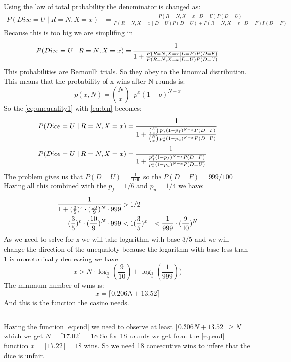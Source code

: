 Using the law of total probability the denominator is changed as:
\begin{align*}
P(Dice=U\mid R=N,X=x) &= \frac{P(R=N,X=x\mid D=U)P(D=U)}{P(R=N,X=x\mid D=U)P(D=U)+P(R=N,X=x\mid D=F)P(D=F)}
\end{align*}
Because this is too big we are simplifing in
\begin{equation} \label{eq:unequality1}
P(Dice=U\mid R=N,X=x) =\cfrac{1}{1+ \frac{P(R=N,X=x\mid D=F)P(D=F)}{P(R=N,X=x\mid D=U)P(D=U)}}
\end{equation}
This probabilities are Bernoulli trials. So they obey to the binomial distribution.
This means that the probability of x wins after N rounds is:
\begin{equation} \label{eq:bin}
p(x,N) = \binom{N}{x} \cdot p^x(1-p)^{N-x}
\end{equation}
So the \ref{eq:unequality1} with \ref{eq:bin} becomes:
\begin{align*}
P(Dice=U\mid R=N,X=x) &=\cfrac{1}{1+ \frac{\binom{N}{x} \cdot p_f^x(1-p_f)^{N-x}P(D=F)}{\binom{N}{x} \cdot p_u^x(1-p_u)^{N-x}P(D=U)}} \\
P(Dice=U\mid R=N,X=x) &=\cfrac{1}{1+\frac{p_f^x(1-p_f)^{N-x}P(D=F)}{p_u^x(1-p_u)^{N-x}P(D=U)}}
\end{align*}
The problem gives us that $P(D=U) = \frac{1}{1000}$ so the $P(D=F) =999/100$
Having all this combined with the $p_f=1/6$ and $p_u=1/4$ we have:
\begin{align*}
\cfrac{1}{1 + (\frac{3}{5})^x\cdot(\frac{10}{9})^N\cdot999 } &> 1/2 \\
(\frac{3}{5})^x\cdot(\frac{10}{9})^N\cdot999 &<1
(\frac{3}{5})^x &< \frac{1}{999}\cdot(\frac{9}{10})^N
\end{align*}
As we need to solve for x we will take logarithm with base $3/5$
and we will change the direction of the unequaloty because the 
logarithm with base less than 1 is monotonically decreasing we have
\begin{equation}
x > N\cdot\log_{\frac{3}{5}}(\frac{9}{10})+\log_{\frac{3}{5}}(\frac{1}{999}))
\end{equation}
The minimum number of wins is:
\begin{equation} \label{eq:end}
x = \lceil 0.206N + 13.52  \rceil
\end{equation}
And this is the function the casino needs.
\subsection{}
Having the function \ref{eq:end} we need to observe at least
$\lceil 0.206N + 13.52  \rceil \geq N$ which we get $N = \lceil 17.02 \rceil = 18$
So for 18 rounds we get from the \ref{eq:end} function $x = \lceil 17.22 \rceil = 18$ wins.
So we need 18 consecutive wins to infere that the dice is unfair.

